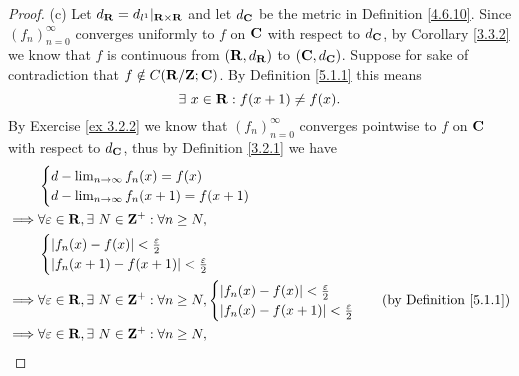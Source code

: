 \begin{proof}{(c)}
    Let \(d_{\mathbf{R}} = d_{l^1}|_{\mathbf{R} \times \mathbf{R}}\) and let \(d_{\mathbf{C}}\) be the metric in Definition \ref{4.6.10}.
    Since \((f_n)_{n = 0}^\infty\) converges uniformly to \(f\) on \(\mathbf{C}\) with respect to \(d_{\mathbf{C}}\), by Corollary \ref{3.3.2} we know that \(f\) is continuous from \((\mathbf{R}, d_{\mathbf{R}})\) to \((\mathbf{C}, d_{\mathbf{C}})\).
    Suppose for sake of contradiction that \(f \notin C(\mathbf{R} / \mathbf{Z} ; \mathbf{C})\).
    By Definition \ref{5.1.1} this means
    \[
        \exists\ x \in \mathbf{R} : f(x + 1) \neq f(x).
    \]
    By Exercise \ref{ex 3.2.2} we know that \((f_n)_{n = 0}^\infty\) converges pointwise to \(f\) on \(\mathbf{C}\) with respect to \(d_{\mathbf{C}}\), thus by Definition \ref{3.2.1} we have
    \begin{align*}
                 & \begin{cases}
                       d - \lim_{n \to \infty} f_n(x) = f(x) \\
                       d - \lim_{n \to \infty} f_n(x + 1) = f(x + 1)
                   \end{cases}                                                                         \\
        \implies & \forall \varepsilon \in \R, \exists\ N \in \Z^+ : \forall n \geq N,                                                  \\
                 & \begin{cases}
                       \abs{f_n(x) - f(x)} < \frac{\varepsilon}{2} \\
                       \abs{f_n(x + 1) - f(x + 1)} < \frac{\varepsilon}{2}
                   \end{cases}                                                                   \\
        \implies & \forall \varepsilon \in \R, \exists\ N \in \Z^+ : \forall n \geq N, \begin{cases}
                                                                                           \abs{f_n(x) - f(x)} < \frac{\varepsilon}{2} \\
                                                                                           \abs{f_n(x) - f(x + 1)} < \frac{\varepsilon}{2}
                                                                                       \end{cases} & \text{(by Definition \ref{5.1.1})} \\
        \implies & \forall \varepsilon \in \R, \exists\ N \in \Z^+ : \forall n \geq N,                                                  \\

\end{align*}
\end{proof}
